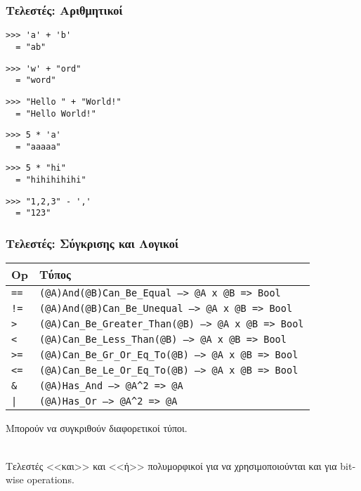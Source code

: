 \documentclass{beamer}
\def\e{\foreignlanguage{english}}
\begin{document}
\begin{frame}[fragile]

\frametitle{Τελεστές: Αριθμητικοί}

\begin{otherlanguage}{english}
\begin{verbatim}
>>> 'a' + 'b'
  = "ab"
\end{verbatim}
\pause
\begin{verbatim}
>>> 'w' + "ord"
  = "word"
\end{verbatim}
\pause
\begin{verbatim}
>>> "Hello " + "World!"
  = "Hello World!"
\end{verbatim}
\pause
\begin{verbatim}
>>> 5 * 'a'
  = "aaaaa"
\end{verbatim}
\pause
\begin{verbatim}
>>> 5 * "hi"
  = "hihihihihi"
\end{verbatim}
\pause
\begin{verbatim}
>>> "1,2,3" - ','
  = "123"
\end{verbatim}
\end{otherlanguage}

\end{frame}

\begin{frame}[fragile]

\frametitle{Τελεστές: Σύγκρισης και Λογικοί}

\begin{center}
\begin{tabular}{ |P{0.8cm}|P{9.4cm}| }
 \hline
 \e{Op} & Τύπος
 \\
 \hline
 \e{\texttt{==}} & \e{\texttt{(@A)And(@B)Can\_Be\_Equal --> @A x @B => Bool}}
 \\
 \e{\texttt{!=}} & \e{\texttt{(@A)And(@B)Can\_Be\_Unequal --> @A x @B => Bool}}
 \\
 \e{\texttt{>}} & \e{\texttt{(@A)Can\_Be\_Greater\_Than(@B) --> @A x @B => Bool}}
 \\
 \e{\texttt{<}} & \e{\texttt{(@A)Can\_Be\_Less\_Than(@B) --> @A x @B => Bool}}
 \\
 \e{\texttt{>=}} & \e{\texttt{(@A)Can\_Be\_Gr\_Or\_Eq\_To(@B) --> @A x @B => Bool}}
 \\
 \e{\texttt{<=}} & \e{\texttt{(@A)Can\_Be\_Le\_Or\_Eq\_To(@B) --> @A x @B => Bool}}
 \\
 \e{\texttt{\&}} & \e{\texttt{(@A)Has\_And --> @A}\texttt{\^}\texttt{2 => @A}}
 \\
 \e{\texttt{|}} & \e{\texttt{(@A)Has\_Or --> @A}\texttt{\^}\texttt{2 => @A}}
 \\
 \hline
\end{tabular}
\end{center}

\pause
Μπορούν να συγκριθούν διαφορετικοί τύποι.
\\~\

Τελεστές <<και>> και <<ή>> πολυμορφικοί για να χρησιμοποιούνται και για
\e{bitwise operations}.
\\~\

\end{frame}
\end{document}
